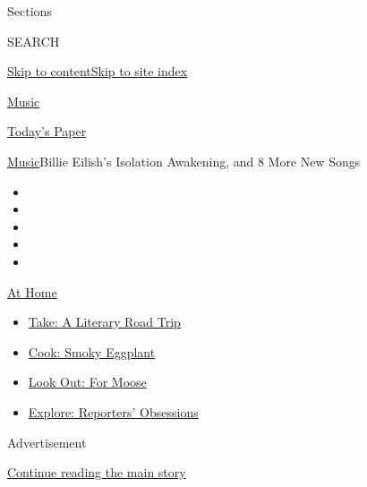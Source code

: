 Sections

SEARCH

\protect\hyperlink{site-content}{Skip to
content}\protect\hyperlink{site-index}{Skip to site index}

\href{https://www.nytimes.com/section/arts/music}{Music}

\href{https://myaccount.nytimes.com/auth/login?response_type=cookie\&client_id=vi}{}

\href{https://www.nytimes.com/section/todayspaper}{Today's Paper}

\href{/section/arts/music}{Music}\textbar{}Billie Eilish's Isolation
Awakening, and 8 More New Songs

\begin{itemize}
\item
\item
\item
\item
\item
\end{itemize}

\href{https://www.nytimes.com/spotlight/at-home?action=click\&pgtype=Article\&state=default\&region=TOP_BANNER\&context=at_home_menu}{At
Home}

\begin{itemize}
\tightlist
\item
  \href{https://www.nytimes.com/2020/07/28/books/time-for-a-literary-road-trip.html?action=click\&pgtype=Article\&state=default\&region=TOP_BANNER\&context=at_home_menu}{Take:
  A Literary Road Trip}
\item
  \href{https://www.nytimes.com/2020/07/29/magazine/bored-with-your-home-cooking-some-smoky-eggplant-will-fix-that.html?action=click\&pgtype=Article\&state=default\&region=TOP_BANNER\&context=at_home_menu}{Cook:
  Smoky Eggplant}
\item
  \href{https://www.nytimes.com/2020/07/27/travel/moose-michigan-isle-royale.html?action=click\&pgtype=Article\&state=default\&region=TOP_BANNER\&context=at_home_menu}{Look
  Out: For Moose}
\item
  \href{https://www.nytimes.com/interactive/2020/at-home/even-more-reporters-editors-diaries-lists-recommendations.html?action=click\&pgtype=Article\&state=default\&region=TOP_BANNER\&context=at_home_menu}{Explore:
  Reporters' Obsessions}
\end{itemize}

Advertisement

\protect\hyperlink{after-top}{Continue reading the main story}

